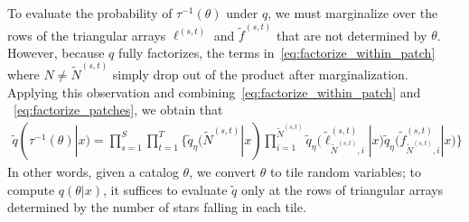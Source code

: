 To evaluate the probability of $\tau^{-1}(\theta)$ under $q$, we must marginalize over the rows of the triangular arrays $\ell^{(s, t)}$ and $\tilde f^{(s, t)}$ that are not determined by $\theta$. However, 
because $q$ fully factorizes, the terms 
in~\eqref{eq:factorize_within_patch} where $N \not= \tilde N^{(s,t)}$ simply drop out of the product
after marginalization.
Applying this observation and combining~\eqref{eq:factorize_within_patch} and ~\eqref{eq:factorize_patches}, we obtain that
\begin{align}
    \tilde q(\tau^{-1}(\theta) | x) = \prod_{s=1}^S\prod_{t=1}^T
    \Big\{
    \tilde q_\eta(\tilde N^{(s,t)} | x) 
    \prod_{i = 1}^{\tilde N^{(s,t)}}
    \tilde q_\eta\big(\tilde \ell_{\tilde N^{(s,t)},i}^{(s, t)} | x\big)
    \tilde q_\eta\big(\tilde f_{\tilde N^{(s,t)},i}^{(s, t)} | x\big)
    \Big\}
\end{align}
In other words, given a catalog $\theta$,
we convert $\theta$ to tile random variables;
to compute $q(\theta | x)$, it suffices to evaluate $\tilde q$ only at the rows of triangular 
arrays determined by the number 
of stars falling in each tile. 



